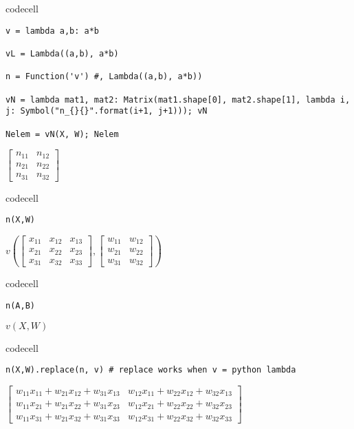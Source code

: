 codecell

\begin{verbatim}
v = lambda a,b: a*b

vL = Lambda((a,b), a*b)

n = Function('v') #, Lambda((a,b), a*b))

vN = lambda mat1, mat2: Matrix(mat1.shape[0], mat2.shape[1], lambda i, j: Symbol("n_{}{}".format(i+1, j+1))); vN

Nelem = vN(X, W); Nelem
\end{verbatim}

$\displaystyle \left[\begin{matrix}n_{11} & n_{12}\\n_{21} & n_{22}\\n_{31} & n_{32}\end{matrix}\right]$

codecell

\begin{verbatim}
n(X,W)
\end{verbatim}

$\displaystyle v{\left(\left[\begin{matrix}x_{11} & x_{12} & x_{13}\\x_{21} & x_{22} & x_{23}\\x_{31} & x_{32} & x_{33}\end{matrix}\right],\left[\begin{matrix}w_{11} & w_{12}\\w_{21} & w_{22}\\w_{31} & w_{32}\end{matrix}\right] \right)}$

codecell

\begin{verbatim}
n(A,B)
\end{verbatim}

$\displaystyle v{\left(X,W \right)}$

codecell

\begin{verbatim}
n(X,W).replace(n, v) # replace works when v = python lambda
\end{verbatim}

$\displaystyle \left[\begin{matrix}w_{11} x_{11} + w_{21} x_{12} + w_{31} x_{13} & w_{12} x_{11} + w_{22} x_{12} + w_{32} x_{13}\\w_{11} x_{21} + w_{21} x_{22} + w_{31} x_{23} & w_{12} x_{21} + w_{22} x_{22} + w_{32} x_{23}\\w_{11} x_{31} + w_{21} x_{32} + w_{31} x_{33} & w_{12} x_{31} + w_{22} x_{32} + w_{32} x_{33}\end{matrix}\right]$

